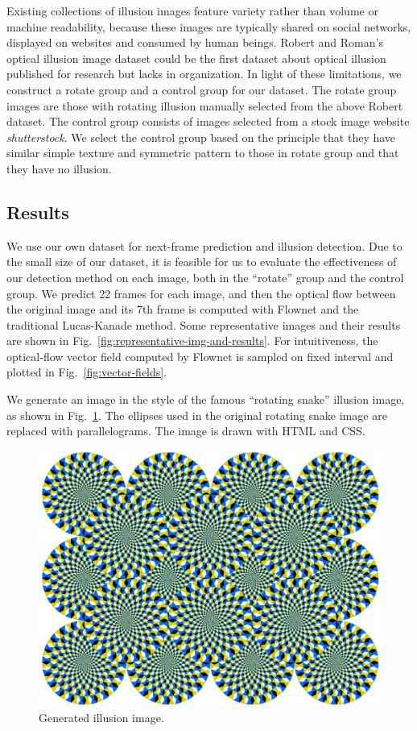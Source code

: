 \documentclass[journal]{IEEEtran}
\begin{document}
  Existing collections of illusion images feature variety rather than volume or machine readability, because these images are typically shared on social networks, displayed on websites and consumed by human beings. Robert and Roman's optical illusion image dataset \cite{williams2018optical} could be the first dataset about optical illusion published for research but lacks in organization. In light of these limitations, we construct a rotate group and a control group for our dataset. The rotate group images are those with rotating illusion manually selected from the above Robert dataset. The control group consists of images selected from a stock image website \emph{shutterstock}. We select the control group based on the principle that they have similar simple texture and symmetric pattern to those in rotate group and that they have no illusion.
  
  \subsection{Results}
  
  We use our own dataset for next-frame prediction and illusion detection. Due to the small size of our dataset, it is feasible for us to evaluate the effectiveness of our detection method on each image, both in the ``rotate'' group and the control group. We predict 22 frames for each image, and then the optical flow between the original image and its 7th frame is computed with Flownet and the traditional Lucas-Kanade method. Some representative images and their results are shown in Fig.~\ref{fig:representative-img-and-results}. For intuitiveness, the optical-flow vector field computed by Flownet is sampled on fixed interval and plotted in Fig.~\ref{fig:vector-fields}.

  We generate an image in the style of the famous ``rotating snake'' illusion image, as shown in Fig.~\ref{fig:generated}. The ellipses used in the original rotating snake image are replaced with parallelograms. The image is drawn with HTML and CSS.

  \begin{figure}[t]
    \centering
    \includegraphics[width=\linewidth]{fig/generated.png}
    \caption{Generated illusion image.}
    \label{fig:generated}
  \end{figure}
  
\end{document}
